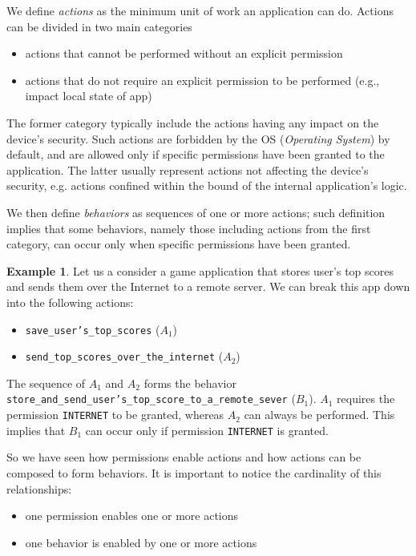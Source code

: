 \documentclass[twoside,letterpaper]{soups}
\theoremstyle{definition}
\newtheorem{example}{Example}
\begin{document}

We define \emph{actions} as the minimum unit of work an application can do. Actions can be divided in two main categories

\begin{itemize}
       \item actions that cannot be performed without an explicit permission
       \item actions that do not require an explicit permission to be performed  (e.g., impact local state of app)
\end{itemize}
The former category typically include the actions having any impact on the device's security. Such actions are forbidden by the OS (\emph{Operating System}) by default, and are allowed only if specific permissions have been granted to the application. The latter usually represent actions not affecting the device's security, e.g. actions confined within the bound of the internal application's logic.

We then define \emph{behaviors} as sequences of one or more actions; such definition implies that some behaviors, namely those including actions from the first category, can occur only when specific permissions have been granted.


\begin{example}
\leavevmode
Let us a consider a game application that stores user's top scores and sends them over the Internet to a remote server.
We can break this app down into the following actions:
\begin{itemize}
       \item \texttt{save\_user's\_top\_scores} ($A_1$)
       \item \texttt{send\_top\_scores\_over\_the\_internet} ($A_2$)
\end{itemize} 
The sequence of $A_1$ and $A_2$ forms the behavior \texttt{store\_and\_send\_user's\_top\_score\_to\_a\_remote\_sever} ($B_1$).
$A_1$ requires the permission \texttt{INTERNET} to be granted, whereas $A_2$ can always be performed.
This implies that $B_1$ can occur only if permission \texttt{INTERNET} is granted.
\end{example}

So we have seen how permissions enable actions and how actions can be composed to form behaviors. It is important to notice the cardinality of this relationships:
\begin{itemize}
       \item one permission enables one or more actions
       \item one behavior is enabled by one or more actions
\end{itemize}
\end{document}

